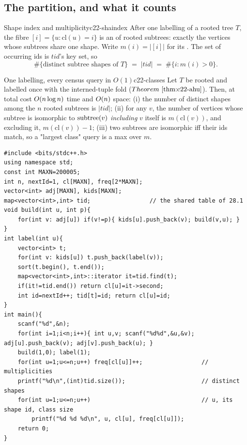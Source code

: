 \subsection{The partition, and what it counts}

\begin{definition}{Shape index and multiplicity}{c22-shaindex}
After one labelling of a rooted tree \(T\), the fibre
\([i]=\{u:\mathrm{cl}(u)=i\}\) is an  of rooted subtrees:
exactly the vertices whose subtrees share one shape.  Write
\(m(i)=\bigl| [i]\bigr|\) for its .  The set of occurring ids
is \(\mathit{tid}\)'s key set, so
\[
   \#\{\text{distinct subtree shapes of }T\}\;=\;|\mathit{tid}|\;=\;\#\{i: m(i)>0\}.
\]
\end{definition}

\begin{theorem}{One labelling, every census query in \(O(1)\)}{c22-classes}
Let \(T\) be rooted and labelled once with the interned-tuple fold
(\(\thmref{c22-ahu}\)).  Then, at total cost \(O(n\log n)\) time and
\(O(n)\) space: (i) the number of distinct shapes among the \(n\) rooted
subtrees is \(|\mathit{tid}|\); (ii) for any \(v\), the number of vertices whose
subtree is isomorphic to \(\operatorname{subtree}(v)\) \emph{including} \(v\) itself is
\(m(\mathrm{cl}(v))\), and excluding it, \(m(\mathrm{cl}(v))-1\); (iii) two
subtrees are isomorphic iff their ids match, so a "largest class" query is a
max over \(m\).
\end{theorem}

\begin{lstlisting}[caption={Census of subtree shapes: after the 28.1 labelling, one counting pass gives the number of distinct shapes and every class size; queries are O(1)}, label={lst:c22-classes}]
#include <bits/stdc++.h>
using namespace std;
const int MAXN=200005;
int n, nextId=1, cl[MAXN], freq[2*MAXN];
vector<int> adj[MAXN], kids[MAXN];
map<vector<int>,int> tid;                 // the shared table of 28.1
void build(int u, int p){
    for(int v: adj[u]) if(v!=p){ kids[u].push_back(v); build(v,u); }
}
int label(int u){
    vector<int> t;
    for(int v: kids[u]) t.push_back(label(v));
    sort(t.begin(), t.end());
    map<vector<int>,int>::iterator it=tid.find(t);
    if(it!=tid.end()) return cl[u]=it->second;
    int id=nextId++; tid[t]=id; return cl[u]=id;
}
int main(){
    scanf("%d",&n);
    for(int i=1;i<n;i++){ int u,v; scanf("%d%d",&u,&v); adj[u].push_back(v); adj[v].push_back(u); }
    build(1,0); label(1);
    for(int u=1;u<=n;u++) freq[cl[u]]++;                 // multiplicities
    printf("%d\n",(int)tid.size());                      // distinct shapes
    for(int u=1;u<=n;u++)                                // u, its shape id, class size
        printf("%d %d %d\n", u, cl[u], freq[cl[u]]);
    return 0;
}
\end{lstlisting}

